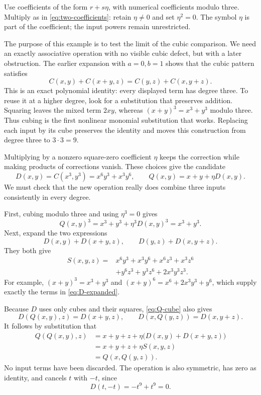 \documentclass[11pt,letterpaper]{article}
\numberwithin{equation}{section}
\theoremstyle{definition}\newtheorem{example}[theorem]{Example}
\begin{document}
Use coefficients of the form \(r+s\eta\), with numerical coefficients modulo three. Multiply as in \eqref{eq:two-coefficients}: retain \(\eta\ne0\) and set \(\eta^2=0\). The symbol \(\eta\) is part of the coefficient; the input powers remain unrestricted.

The purpose of this example is to test the limit of the cubic comparison. We need an exactly associative operation with no visible cubic defect, but with a later obstruction. The earlier expansion with \(a=0,b=1\) shows that the cubic pattern satisfies
\[
 C(x,y)+C(x+y,z)=C(y,z)+C(x,y+z).
\]
This is an exact polynomial identity: every displayed term has degree three. To reuse it at a higher degree, look for a substitution that preserves addition. Squaring leaves the mixed term \(2xy\), whereas \((x+y)^3=x^3+y^3\) modulo three. Thus cubing is the first nonlinear monomial substitution that works. Replacing each input by its cube preserves the identity and moves this construction from degree three to \(3\cdot3=9\).

Multiplying by a nonzero square-zero coefficient \(\eta\) keeps the correction while making products of corrections vanish. These choices give the candidate
\[
 D(x,y)=C(x^3,y^3)=x^6y^3+x^3y^6,
 \qquad Q(x,y)=x+y+\eta D(x,y).
\]
We must check that the new operation really does combine three inputs consistently in every degree.

First, cubing modulo three and using \(\eta^3=0\) gives
\begin{equation}\label{eq:Q-cube}
 Q(x,y)^3=x^3+y^3+\eta^3D(x,y)^3=x^3+y^3.
\end{equation}
Next, expand the two expressions
\[
 D(x,y)+D(x+y,z),\qquad D(y,z)+D(x,y+z).
\]
They both give
\begin{equation}\label{eq:D-expanded}
 \begin{split}
 S(x,y,z)={}&x^6y^3+x^3y^6+x^6z^3+x^3z^6\\
 &+y^6z^3+y^3z^6+2x^3y^3z^3.
 \end{split}
\end{equation}
For example, \((x+y)^3=x^3+y^3\) and \((x+y)^6=x^6+2x^3y^3+y^6\), which supply exactly the terms in \eqref{eq:D-expanded}.

Because \(D\) uses only cubes and their squares, \eqref{eq:Q-cube} also gives
\[
 D(Q(x,y),z)=D(x+y,z),\qquad
 D(x,Q(y,z))=D(x,y+z).
\]
It follows by substitution that
\begin{align*}
 Q(Q(x,y),z)
 &=x+y+z+\eta\bigl(D(x,y)+D(x+y,z)\bigr)\\
 &=x+y+z+\eta S(x,y,z)\\
 &=Q(x,Q(y,z)).
\end{align*}
No input terms have been discarded. The operation is also symmetric, has zero as identity, and cancels \(t\) with \(-t\), since
\[
 D(t,-t)=-t^9+t^9=0.
\]
\end{document}
